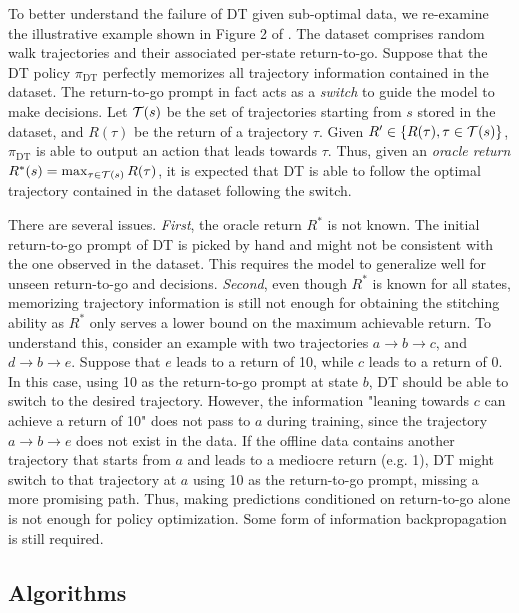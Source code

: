 To better understand the failure of DT given sub-optimal data, we re-examine the illustrative example shown in Figure 2 of \citet{chen2021decision}.  
The dataset comprises random walk trajectories and their associated per-state return-to-go.   
Suppose that the DT policy $\pi_{\mathrm{DT}}$ perfectly memorizes  all trajectory information contained in the  dataset. The return-to-go prompt in fact acts as a \emph{switch} to guide the model to make decisions.  
Let ${\mathcal{T}}(s)$ be the set of trajectories starting from $s$ stored in the dataset, and $R(\tau)$ be the return of  a trajectory $\tau$.  
Given $R'\in\{ R(\tau), \tau\in{\mathcal{T}}(s) \}$, $\pi_{\mathrm{DT}}$ is able to output an action that leads towards $\tau$. 
Thus, given an \emph{oracle return} $R^*(s)=\max_{\tau\in{\mathcal{T}}(s)} R(\tau)$, it is expected that DT is able to follow the optimal trajectory contained in the dataset following the switch. 


There are several issues. \emph{First}, the oracle return $R^*$ is not known. The initial return-to-go prompt of DT is picked by hand and might not be consistent with the one observed in the dataset. This requires the model to generalize well for unseen return-to-go and decisions. 
\emph{Second}, even though $R^*$ is known for all states, memorizing trajectory information is still not enough for obtaining the stitching ability as $R^*$ only serves a lower bound on the maximum achievable return. 
To understand this, 
consider an example with two trajectories $a\rightarrow b\rightarrow c$, and $d\rightarrow b\rightarrow e$. Suppose that $e$ leads to a return of 10, while $c$ leads to a return of 0. 
In this case, using 10 as the return-to-go prompt at state $b$, DT should be able to switch to the desired trajectory. 
However, the information "leaning towards $c$ can achieve a return of 10" does not pass to $a$ during training, since the trajectory $a\rightarrow b\rightarrow e$ does not exist in the data. 
If the offline data contains another trajectory that starts from $a$ and leads to a mediocre return (e.g. 1), DT might switch to that trajectory at $a$ using 10 as the  return-to-go prompt, missing a more promising path. 
Thus,  making predictions conditioned on return-to-go alone is not enough for policy optimization. Some form of information backpropagation is still required. 


\subsection{Algorithms}

